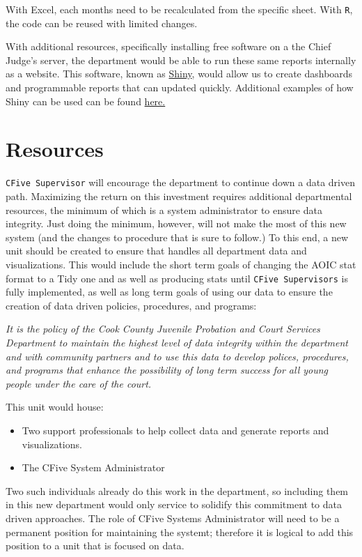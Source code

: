 \documentclass[12pt,]{article}
\providecommand{\tightlist}{%
  \setlength{\itemsep}{0pt}\setlength{\parskip}{0pt}}
\begin{document}
With Excel, each months need to be recalculated from the specific sheet.
With \texttt{R}, the code can be reused with limited changes.

With additional resources, specifically installing free software on a
the Chief Judge's server, the department would be able to run these same
reports internally as a website. This software, known as
\href{https://shiny.rstudio.com}{Shiny}, would allow us to create
dashboards and programmable reports that can updated quickly. Additional
examples of how Shiny can be used can be found
\href{https://shiny.rstudio.com/gallery/}{here.}

\hypertarget{resources}{%
\section{Resources}\label{resources}}

\texttt{CFive\ Supervisor} will encourage the department to continue
down a data driven path. Maximizing the return on this investment
requires additional departmental resources, the minimum of which is a
system administrator to ensure data integrity. Just doing the minimum,
however, will not make the most of this new system (and the changes to
procedure that is sure to follow.) To this end, a new unit should be
created to ensure that handles all department data and visualizations.
This would include the short term goals of changing the AOIC stat format
to a Tidy one and as well as producing stats until
\texttt{CFive\ Supervisor\textquotesingle{}s} is fully implemented, as
well as long term goals of using our data to ensure the creation of data
driven policies, procedures, and programs:

\emph{It is the policy of the Cook County Juvenile Probation and Court
Services Department to maintain the highest level of data integrity
within the department and with community partners and to use this data
to develop polices, procedures, and programs that enhance the
possibility of long term success for all young people under the care of
the court.}

This unit would house:

\begin{itemize}
\tightlist
\item
  Two support professionals to help collect data and generate reports
  and visualizations.
\item
  The CFive System Administrator
\end{itemize}

Two such individuals already do this work in the department, so
including them in this new department would only service to solidify
this commitment to data driven approaches. The role of CFive Systems
Administrator will need to be a permanent position for maintaining the
systemt; therefore it is logical to add this position to a unit that is
focused on data.
\end{document}
